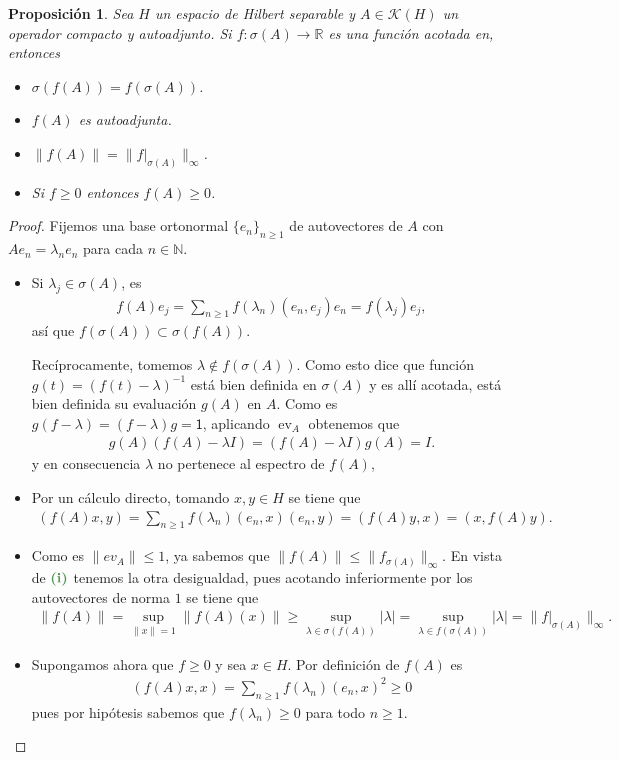 \documentclass[11pt]{report}
\theoremstyle{colored}
\newtheorem{proposition}{Proposición}[section]
\newcommand{\N}{\mathbb{N}}
\newcommand{\R}{\mathbb{R}}
\newcommand{\ev}{\operatorname{ev}}
\newcommand{\ip}[1]{( #1 )}
\newcommand{\paint}[1]{\color{color}{#1}}
\newcommand{\tpaint}[1]{\paint{\textbf{#1}}}
\begin{document}
\begin{proposition} Sea $H$ un espacio de Hilbert separable y $A \in \mathscr{K}(H)$ un operador compacto y autoadjunto. Si $f : \sigma(A) \to \R$ es una función acotada en, entonces
\begin{itemize}
\item[(i)] $\sigma(f(A)) = f(\sigma(A))$.
\item[(ii)] $f(A)$ es autoadjunta.
\item[(iii)] $\|f(A)\| = \|f|_{\sigma(A)}\|_{\infty}$.
\item[(iv)] Si $f \geq 0$ entonces $f(A) \geq 0$.
\end{itemize}
\end{proposition}
\begin{proof} Fijemos una base ortonormal $\{e_n\}_{n \geq 1}$ de autovectores de $A$ con $Ae_n = \lambda_ne_n$ para cada $n \in \N$. 
\begin{itemize}[listparindent = \parindent]
\item[(i)] Si $\lambda_j \in \sigma(A)$, es
\begin{align*}
f(A)e_j = \sum_{n \geq 1}f(\lambda_n)(e_n,e_j)e_n = f(\lambda_j)e_j,
\end{align*}
así que $f(\sigma(A)) \subset \sigma(f(A))$. 

Recíprocamente, tomemos $\lambda \not \in f(\sigma(A))$. Como esto dice que función $g(t) = (f(t)-\lambda)^{-1}$ está bien definida en $\sigma(A)$ y es allí acotada, está bien definida su evaluación $g(A)$ en $A$. Como es $g(f-\lambda) = (f-\lambda)g = \mathsf{1}$, aplicando $\ev_A$ obtenemos que
\begin{align*}
g(A)(f(A)- \lambda I) = (f(A) - \lambda I)g(A) = I.
\end{align*}
y en consecuencia $\lambda$ no pertenece al espectro de $f(A)$,
\item[(ii)] Por un cálculo directo, tomando $x,y \in H$ se tiene que 
\begin{align*}
\ip{f(A)x, y} = \sum_{n \geq 1} f(\lambda_n) \ip{e_n, x}\ip{e_n,y}  = \ip{f(A)y,x} = \ip{x, f(A)y}.
\end{align*}
\item[(iii)] Como es $\|ev_A\| \leq 1$, ya sabemos que $\|f(A)\| \leq \|f_{\sigma(A)}\|_\infty$. En vista de $\tpaint{(i)}$ tenemos la otra desigualdad, pues acotando inferiormente por los autovectores de norma $1$ se tiene que 
\begin{align*}
\|f(A)\| = \sup_{\|x\| = 1}\|f(A)(x)\| \geq \sup_{\lambda \in \sigma(f(A))}|\lambda| = \sup_{\lambda \in f(\sigma(A))}|\lambda| = \|f|_{\sigma(A)}\|_\infty.
\end{align*}
\item[(iv)] Supongamos ahora que $f \geq 0$ y sea $x \in H$. Por definición de $f(A)$ es 
\begin{align*}
(f(A)x,x) = \sum_{n \geq 1} f(\lambda_n) \ip{e_n, x}^2 \geq 0
\end{align*}
pues por hipótesis sabemos que $f(\lambda_n) \geq 0$ para todo $n \geq 1$.
\end{itemize}
\end{proof}
\end{document}
